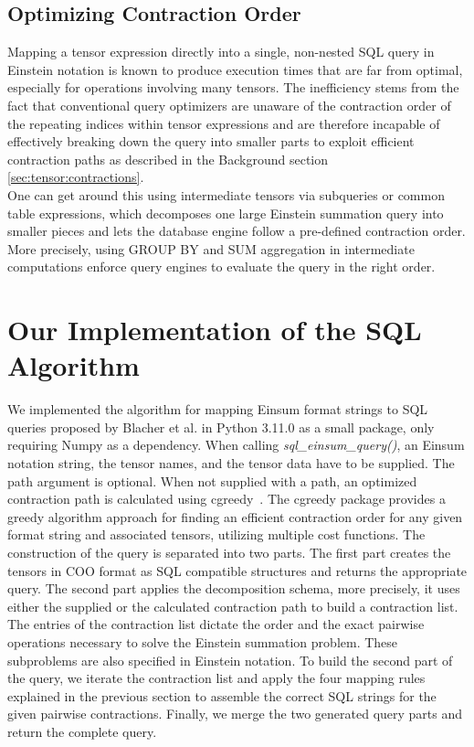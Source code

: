 \subsection{Optimizing Contraction Order}
Mapping a tensor expression directly into a single, non-nested SQL query in Einstein
notation is known to produce execution times that are far from optimal, especially for operations
involving many tensors. The inefficiency stems from the fact that conventional query optimizers
are unaware of the contraction order of the repeating indices within tensor expressions and are
therefore incapable of effectively breaking down the query into smaller parts to exploit efficient
contraction paths as described in the Background section \ref{sec:tensor:contractions}.\\
One can get around this using intermediate tensors via subqueries or common table expressions,
which decomposes one large Einstein summation query into smaller pieces and lets the database
engine follow a pre-defined contraction order. More precisely, using GROUP BY and SUM
aggregation in intermediate computations enforce query engines to evaluate the query in the
right order.

\section{Our Implementation of the SQL Algorithm}
We implemented the algorithm for mapping Einsum format strings to SQL queries proposed by Blacher
et al. in Python 3.11.0 as a small package, only requiring Numpy as a dependency. When
calling \textit{sql\_einsum\_query()}, an Einsum notation string, the tensor names, and the tensor
data have to be supplied. The path argument is optional. When not supplied with a path, an
optimized contraction path is calculated using cgreedy~\cite{cgreedy}. The cgreedy package
provides a greedy algorithm approach for finding an efficient contraction order for any given
format string and associated tensors, utilizing multiple cost functions. The construction of the
query is separated into two parts. The first part creates the tensors in COO format as SQL
compatible structures and returns the appropriate query. The second part applies the decomposition
schema, more precisely, it uses either the supplied or the calculated contraction path to build a
contraction list. The entries of the contraction list dictate the order and the exact pairwise
operations necessary to solve the Einstein summation problem. These subproblems are also specified
in Einstein notation. To build the second part of the query, we iterate the contraction list and
apply the four mapping rules explained in the previous section to assemble the correct SQL
strings for the given pairwise contractions. Finally, we merge the two generated query parts and
return the complete query.

